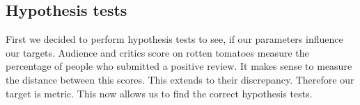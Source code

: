 \documentclass{article}
\begin{document}

\subsection{Hypothesis tests}
    First we decided to perform hypothesis tests to see, if our parameters influence our targets. Audience and critics score on rotten tomatoes measure the percentage of people who submitted a positive review. It makes sense to measure the distance between this scores. This extends to their discrepancy. Therefore our target is metric. This now allows us to find the correct hypothesis tests.
\end{document}
